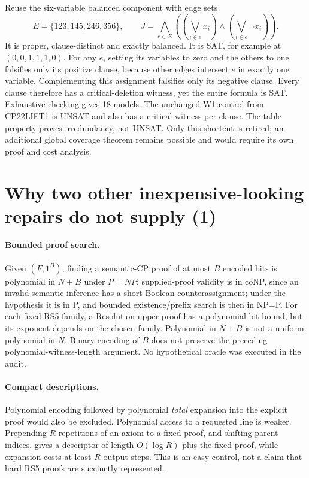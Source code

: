 \documentclass[11pt]{article}
\begin{document}
Reuse the six-variable balanced component with edge sets
\[
 E=\{123,145,246,356\},\qquad
 J=\bigwedge_{e\in E}
 ((\bigvee_{i\in e}x_i)\land(\bigvee_{i\in e}\neg x_i)).
\]
It is proper, clause-distinct and exactly balanced. It is SAT, for example
at $(0,0,1,1,1,0)$. For any $e$, setting its variables to zero and the others
to one falsifies only its positive clause, because other edges intersect
$e$ in exactly one variable. Complementing this assignment falsifies only
its negative clause. Every clause therefore has a critical-deletion witness,
yet the entire formula is SAT. Exhaustive checking gives 18 models.
The unchanged W1 control from CP22LIFT1 is UNSAT and also has a critical
witness per clause. The table property proves irredundancy, not UNSAT.
Only this shortcut is retired; an additional global coverage theorem remains
possible and would require its own proof and cost analysis.

\section{Why two other inexpensive-looking repairs do not supply (1)}
\paragraph{Bounded proof search.}
Given $(F,1^B)$, finding a semantic-CP proof of at most $B$ encoded bits is
polynomial in $N+B$ under $P=NP$: supplied-proof validity is in coNP, since
an invalid semantic inference has a short Boolean counterassignment; under
the hypothesis it is in P, and bounded existence/prefix search is then in NP=P.
For each fixed RS5 family, a Resolution upper proof has a polynomial bit
bound, but its exponent depends on the chosen family. Polynomial in $N+B$
is not a uniform polynomial in $N$. Binary encoding of $B$ does not preserve
the preceding polynomial-witness-length argument. No hypothetical oracle
was executed in the audit.

\paragraph{Compact descriptions.}
Polynomial encoding followed by polynomial \emph{total} expansion into the
explicit proof would also be excluded. Polynomial access to a requested
line is weaker. Prepending $R$ repetitions of an axiom to a fixed proof,
and shifting parent indices, gives a descriptor of length $O(\log R)$ plus
the fixed proof, while expansion costs at least $R$ output steps. This is
an easy control, not a claim that hard RS5 proofs are succinctly represented.
\end{document}

